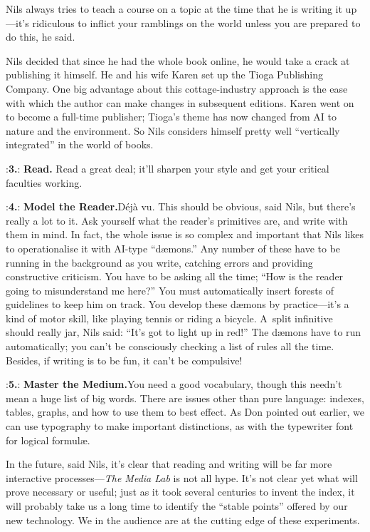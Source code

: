 Nils always tries to teach a course on a topic at the time that he is
writing it up---it's ridiculous to inflict your ramblings on the world
unless you are prepared to do this, he said.

   Nils decided that since he had the whole book online, he would take a
   crack at publishing it himself. He and his wife Karen set up the Tioga
   Publishing Company. One big advantage about this cottage-industry approach 
   is the ease with which the author can make changes in subsequent editions. 
   Karen went on to become a full-time publisher; Tioga's theme has now
changed from AI to nature and the environment. 
So Nils considers himself pretty well
   ``vertically integrated'' in the world of books.

\smallskip
\display 20pt:{\bf 3.}:
{\bf  Read.} \quad Read a great deal; it'll sharpen your style and get your
critical faculties working.

\smallskip
\display 20pt:{\bf 4.}:
{\bf Model the Reader.}\quad  D\'ej\`a vu. This should be obvious, said
Nils, but there's really a lot to it.  Ask yourself what the reader's
primitives are, and write with them in mind. In fact, the whole issue
is so complex and important that Nils likes to operationalise it with
AI-type ``d{\ae}mons.'' Any number of these have to be running in the
background as you write, catching errors and providing constructive
criticism. You have to be asking all the time; ``How is the reader
going to misunderstand me here?'' You must automatically insert forests of
guidelines to keep him on track. You develop these d{\ae}mons by 
practice---it's a kind of motor skill, like playing tennis or riding a bicycle.
A~split infinitive should really jar, Nils said: ``It's got to light
up in red!'' The d{\ae}mons have to run automatically; you can't be
consciously checking a list of rules all the time. Besides, if writing
is to be fun, it can't be compulsive!

\smallskip
\display 20pt:{\bf 5.}:
{\bf Master the Medium.}\quad You need a good vocabulary, though this
needn't mean a huge list of big words. There are issues other than
pure language: indexes, tables, graphs, and how to use them to best
effect. As Don pointed out earlier, we can use typography to make
important distinctions, as with the typewriter font for logical
formul{\ae}.

In the future, said Nils, it's clear that reading and writing will be
far more interactive processes---{\sl The Media Lab\/} is not all
hype.  It's not clear yet what will prove necessary or useful; just as
it took several centuries to invent the index, it will probably take
us a long time to identify the ``stable points'' offered by our new
technology. We in the audience are at the cutting edge of these experiments.

